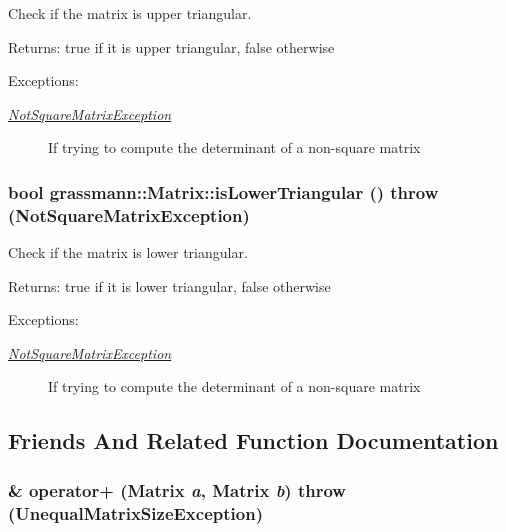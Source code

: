 Check if the matrix is upper triangular. 

\begin{Desc}
\item[Returns:]true if it is upper triangular, false otherwise \end{Desc}
\begin{Desc}
\item[Exceptions:]
\begin{description}
\item[{\em \hyperlink{classgrassmann_1_1NotSquareMatrixException}{NotSquareMatrixException}}]If trying to compute the determinant of a non-square matrix \end{description}
\end{Desc}
\hypertarget{classgrassmann_1_1Matrix_dda0c95c0df60ee264883c22da6d8b76}{
\subsubsection[isLowerTriangular]{\setlength{\rightskip}{0pt plus 5cm}bool grassmann::Matrix::isLowerTriangular ()  throw ({\bf NotSquareMatrixException})}}
\label{classgrassmann_1_1Matrix_dda0c95c0df60ee264883c22da6d8b76}


Check if the matrix is lower triangular. 

\begin{Desc}
\item[Returns:]true if it is lower triangular, false otherwise \end{Desc}
\begin{Desc}
\item[Exceptions:]
\begin{description}
\item[{\em \hyperlink{classgrassmann_1_1NotSquareMatrixException}{NotSquareMatrixException}}]If trying to compute the determinant of a non-square matrix \end{description}
\end{Desc}


\subsection{Friends And Related Function Documentation}
\hypertarget{classgrassmann_1_1Matrix_696c3e88b7f163ac672b4e5dfaa85693}{
\subsubsection[operator+]{\& operator+ ({\bf Matrix} {\em a}, \/  {\bf Matrix} {\em b})  throw ({\bf UnequalMatrixSizeException})}}
\label{classgrassmann_1_1Matrix_696c3e88b7f163ac672b4e5dfaa85693}


